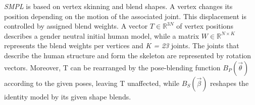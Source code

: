 \emph{SMPL} is based on vertex skinning and blend shapes. A vertex changes its position depending on the motion of the associated joint. This displacement is controlled by assigned blend weights. A vector $T \in \mathbb{R}^{3N}$ of vertex positions describes a gender neutral initial human model, while a matrix $W \in \mathbb{R}^{N \times K}$ represents the blend weights per vertices and \emph{K = 23} joints. The joints that describe the human structure and form the skeleton are represented by rotation vectors. Moreover, T can be rearranged by the pose-blending function $B_{P}(\vec{\theta})$ according to the given poses, leaving T unaffected, while $B_{S}(\vec{\beta})$ reshapes the identity model by its given shape blends.

\cite{smpl}

